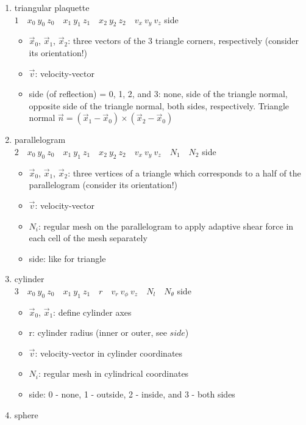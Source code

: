 \begin{enumerate}
	\begin{enumerate}
	\item triangular plaquette\\
		$1\quad x_0\ y_0\ z_0\quad x_1\ y_1\ z_1\quad x_2\ y_2\ z_2\quad v_x\ v_y\ v_z$ { side}
		\begin{itemize}
	   	\item $\vec{x}_0$, $\vec{x}_1$, $\vec{x}_2$: three vectors of the 3 triangle corners, respectively (consider its orientation!)
	   	\item $\vec{v}$: velocity-vector
	   	\item side (of reflection) = 0, 1, 2, and 3: none, side of the triangle normal, opposite side of the triangle normal, both sides, respectively. Triangle normal $ \vec{n} = (\vec{x}_1 - \vec{x}_0) \times (\vec{x}_2 - \vec{x}_0)$
		\end{itemize}
	\item parallelogram\\
		$2\quad x_0\ y_0\ z_0\quad x_1\ y_1\ z_1\quad x_2\ y_2\ z_2\quad v_x\ v_y\ v_z\quad N_1\quad N_2$ { side}
		\begin{itemize}
	   	\item $\vec{x}_0$, $\vec{x}_1$, $\vec{x}_2$: three vertices of a triangle which corresponds to a half of the parallelogram (consider its orientation!)
	   	\item $\vec{v}$: velocity-vector
	   	\item $ N_i$: regular mesh on the parallelogram to apply adaptive shear force in each cell of the mesh separately
	   	\item side: like for triangle
		\end{itemize}
	\item cylinder\\
		$3\quad x_0\ y_0\ z_0\quad x_1\ y_1\ z_1\quad r \quad v_r\ v_{\phi}\ v_z\quad N_l\quad N_{\theta}$ { side}
		\begin{itemize}
	   	\item $\vec{x}_0$, $\vec{x}_1$: define cylinder axes
	   	\item r: cylinder radius (inner or outer, see $side$)
	   	\item $\vec{v}$: velocity-vector in cylinder coordinates
	   	\item $ N_i$: regular mesh in cylindrical coordinates
	   	\item side: 0 - none, 1 - outside, 2 - inside, and 3 - both sides
		\end{itemize}
	\item sphere\\

\end{enumerate}
\end{enumerate}

